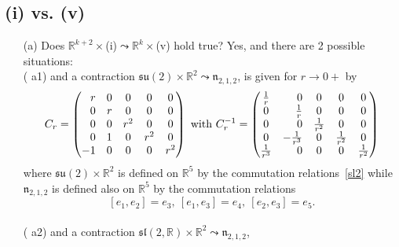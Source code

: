 \documentclass[
reqno]{amsart}
\begin{document}
\subsection{(i) vs. (v)}\label{Case4} 
\begin{itemize}
\item[(a)] Does ${{\mathbb R}}^{k+2}\times$(i)${\leadsto}$${{\mathbb R}}^k\times$(v) hold true?  
Yes, and there are 2 possible situations: 
\\ ({{\bfseries\itshape} a1})  
and a contraction ${{\mathfrak s}{\mathfrak u}}(2)\times{{\mathbb R}}^2{\leadsto} {{\mathfrak n}}_{2,1,2}$, 
is given for $r\to 0+$ by 
$$C_r
=\begin{pmatrix}
\hfill r & \hfill 0 & 0   & 0   & 0 \\
\hfill 0 & \hfill r & 0   & 0   & 0 \\
\hfill 0 &        0 & r^2 & 0   & 0 \\
\hfill 0 & \hfill 1 & 0   & r^2 & 0 \\ 
      -1 & \hfill 0 & 0   & 0   & r^2 
\end{pmatrix}
\text{ with }
C_r^{-1}=
\begin{pmatrix}
 \frac{1}{r} & \hfill 0           & 0             & 0             & 0 \\
           0 & \hfill \frac{1}{r} & 0             & 0             & 0 \\
           0 & \hfill 0           & \frac{1}{r^2} & 0             & 0 \\
           0 &-\frac{1}{r^3}      & 0             & \frac{1}{r^2} & 0 \\ 
\frac{1}{r^3}& \hfill 0           & 0             & 0             & \frac{1}{r^2} 
\end{pmatrix}$$
where ${{\mathfrak s}{\mathfrak u}}(2)\times{{\mathbb R}}^2$ is defined on ${{\mathbb R}}^5$ by the commutation relations~\eqref{sl2}
while ${{\mathfrak n}}_{2,1,2}$ is defined also on ${{\mathbb R}}^5$ 
by the commutation relations 
\begin{equation}\label{N212}
[e_1,e_2]=e_3,\ [e_1,e_3]=e_4,\ [e_2,e_3]=e_5. 
\end{equation}
\\ ({{\bfseries\itshape} a2})  
and a contraction ${{\mathfrak s}{\mathfrak l}}(2,{{\mathbb R}})\times{{\mathbb R}}^2{\leadsto} {{\mathfrak n}}_{2,1,2}$, 
$$
\end{itemize}
\end{document}

